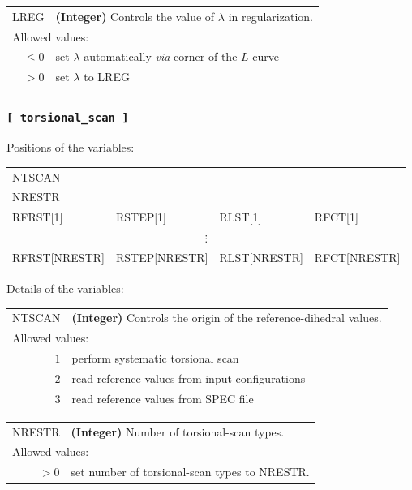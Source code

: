 \documentclass[10pt,a4paper,openany]{memoir}
\numberwithin{equation}{section}
\begin{document}
{
\begin{tabular}{r@{ : }l}
\label{descr:lreg}
LREG&\textbf{(Integer)} Controls the value of $\lambda$ in regularization.                                                             \\ 
\multicolumn{2}{l}{Allowed values:} \\ 
\(\leq0\)& set $\lambda$ automatically \textit{via} corner of the $L$-curve \\ 
    \(>0\)& set $\lambda$ to LREG \\
\end{tabular}
\vspace{1ex}
}

\subsubsection{\texttt{[~torsional\_scan~]}}
\label{sec:inp-torsional_scan}

Positions of the variables:
\begin{center}
  \begin{tabular}{llll}
    NTSCAN &      &      &      \\
    NRESTR &      &      &      \\
    RFRST[1] & RSTEP[1] & RLST[1] & RFCT[1] \\
    \multicolumn{4}{c}{$\vdots$} \\
    RFRST[NRESTR] & RSTEP[NRESTR] & RLST[NRESTR] & RFCT[NRESTR] \\
  \end{tabular}
\end{center}

\noindent Details of the variables:
\vspace{2ex}

{
\begin{tabular}{r@{ : }l}
\label{descr:rfrst}
     NTSCAN&\textbf{(Integer)} Controls the origin of the reference-dihedral values.                \\ 
\multicolumn{2}{l}{Allowed values:} \\ 
\(1\)& perform systematic torsional scan\\ 
\(2\)& read reference values from input configurations\\ 
\(3\)& read reference values from SPEC file\\ 
\end{tabular}
\vspace{1ex}
}

{
\begin{tabular}{r@{ : }l}
\label{descr:rfrst}
     NRESTR&\textbf{(Integer)} Number of torsional-scan types.                \\ 
\multicolumn{2}{l}{Allowed values:} \\ 
\(>0\)& set number of torsional-scan types to NRESTR.\\ 
\end{tabular}
\vspace{1ex}
}
\end{document}
